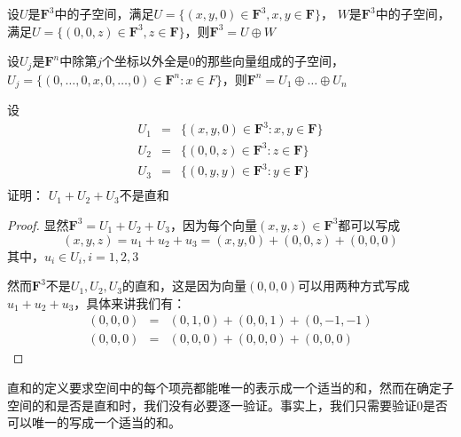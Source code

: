 \documentclass[10pt,a4paper,UTF8]{article}
\begin{document}
\begin{instance}
设\(U\)是\(\mathbf{F}^{3}\)中的子空间，满足\(U=\{(x,y,0)\in \mathbf{F}^{3},x,y\in \mathbf{F}\}\)， \(W\)是\(\mathbf{F}^{3}\)中的子空间，满足\(U=\{(0,0,z)\in \mathbf{F}^{3},z\in \mathbf{F}\}\)，则\(\mathbf{F}^{3} = U\oplus W\)
\end{instance}
\begin{instance}
设\(U_{j}\)是\(\mathbf{F}^{n}\)中除第\(j\)个坐标以外全是\(0\)的那些向量组成的子空间，\(U_{j}=\{(0,\ldots,0,x,0,\ldots,0)\in \mathbf{F}^{n}:x\in F\}\)，则\(\mathbf{F}^{n} = U_{1}\oplus \ldots \oplus U_{n}\)
\end{instance}

\begin{theorem}
设
\begin{eqnarray*}
U_{1} &=& \{(x,y,0)\in \mathbf{F}^{3}: x,y\in \mathbf{F}\} \\
U_{2} &=& \{(0,0,z)\in \mathbf{F}^{3}: z\in \mathbf{F}\} \\
U_{3} &=& \{(0,y,y)\in \mathbf{F}^{3}: y\in \mathbf{F}\} \\
\end{eqnarray*}
证明： \(U_{1} + U_{2} + U_{3}\)不是直和
\end{theorem}
\begin{proof}
显然\(\mathbf{F}^{3} = U_{1}+U_{2}+U_3\)，因为每个向量\((x,y,z)\in \mathbf{F}^{3}\)都可以写成\[(x,y,z) =u_{1} + u_{2} + u_{3} =  (x,y,0) + (0,0,z) + (0,0,0)\]其中，\(u_{i}\in U_{i},i=1,2,3\)

然而\(\mathbf{F}^{3}\)不是\(U_{1},U_{2},U_{3}\)的直和，这是因为向量\((0,0,0)\)可以用两种方式写成\(u_{1} + u_{2} + u_{3}\)，具体来讲我们有：
\begin{eqnarray*}
(0,0,0)&=&(0,1,0) + (0,0,1) + (0,-1,-1) \\
(0,0,0)&=&(0,0,0) + (0,0,0) + (0,0,0) 
\end{eqnarray*}
\end{proof}
直和的定义要求空间中的每个项亮都能唯一的表示成一个适当的和，然而在确定子空间的和是否是直和时，我们没有必要逐一验证。事实上，我们只需要验证\(0\)是否可以唯一的写成一个适当的和。
\end{document}
